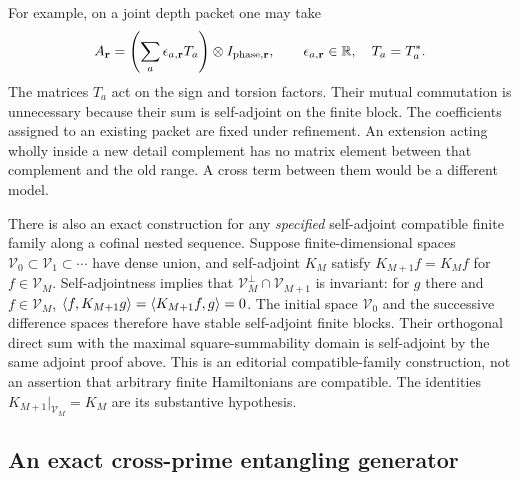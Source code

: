 For example, on a joint depth packet one may take
\[
 A_{\mathbf r}
 =\left(\sum_a\epsilon_{a,\mathbf r}T_a\right)
 \otimes I_{\mathrm{phase},\mathbf r},
 \qquad \epsilon_{a,\mathbf r}\in\mathbb R,\quad T_a=T_a^*.
\]
The matrices $T_a$ act on the sign and torsion factors. Their mutual
commutation is unnecessary because their sum is self-adjoint on the
finite block. The coefficients assigned to an existing packet are fixed
under refinement. An extension acting wholly inside a new detail
complement has no matrix element between that complement and the old
range. A cross term between them would be a different model.

There is also an exact construction for any \emph{specified}
self-adjoint compatible finite family along a cofinal nested sequence.
Suppose finite-dimensional spaces $\mathcal V_0\subset\mathcal V_1
\subset\cdots$ have dense union, and self-adjoint $K_M$ satisfy
$K_{M+1}f=K_Mf$ for $f\in\mathcal V_M$.
Self-adjointness implies that $\mathcal V_M^\perp\cap\mathcal V_{M+1}$
is invariant: for $g$ there and $f\in\mathcal V_M$,
$\left\langle f,K_{M+1}g\right\rangle=\left\langle K_{M+1}f,g\right\rangle=0$.
The initial space $\mathcal V_0$ and the successive difference spaces
therefore have stable self-adjoint finite blocks.
Their orthogonal direct sum with the maximal square-summability domain
is self-adjoint by the same adjoint proof above. This is an editorial
compatible-family construction, not an assertion that arbitrary finite
Hamiltonians are compatible. The identities $K_{M+1}|_{\mathcal V_M}=K_M$
are its substantive hypothesis.

\subsection{An exact cross-prime entangling generator}

